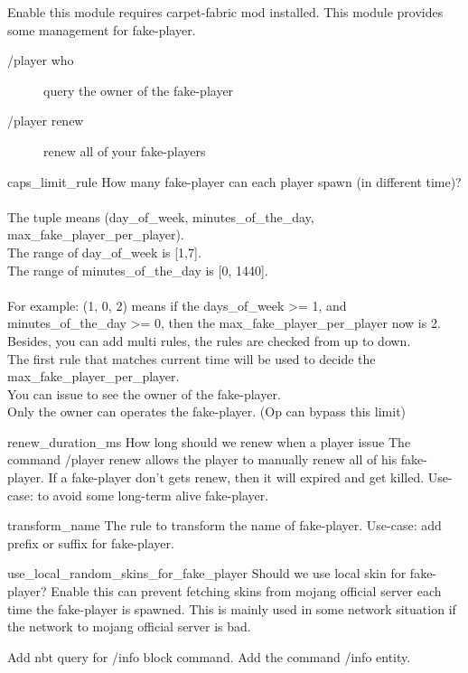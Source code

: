 


Enable this module requires carpet-fabric mod installed.
This module provides some management for fake-player.

\begin{description}
    \item [/player who] query the owner of the fake-player
    \item[/player renew] renew all of your fake-players
\end{description}

\begin{Configuration}
    \item[caps\_limit\_rule] {
        How many fake-player can each player spawn (in different time)?\\
        \\
        The tuple means (day\_of\_week, minutes\_of\_the\_day, max\_fake\_player\_per\_player).\\
        The range of day\_of\_week is [1,7].\\
        The range of minutes\_of\_the\_day is [0, 1440].\\
        \\
        For example: (1, 0, 2) means if the days\_of\_week >= 1, and minutes\_of\_the\_day >= 0, then the max\_fake\_player\_per\_player now is 2.\\
        Besides, you can add multi rules, the rules are checked from up to down.\\
        The first rule that matches current time will be used to decide the max\_fake\_player\_per\_player.\\
        You can issue  to see the owner of the fake-player.\\
        Only the owner can operates the fake-player. (Op can bypass this limit)
    }

    \item[renew\_duration\_ms] {
        How long should we renew when a player issue 
        The command /player renew allows the player to manually renew all of his fake-player.
        If a fake-player don't gets renew, then it will expired and get killed.
        Use-case: to avoid some long-term alive fake-player.
    }

    \item[transform\_name]{
        The rule to transform the name of fake-player.
        Use-case: add prefix or suffix for fake-player.
    }
    \item[use\_local\_random\_skins\_for\_fake\_player]{
        Should we use local skin for fake-player?
        Enable this can prevent fetching skins from mojang official server each time the fake-player is spawned.
        This is mainly used in some network situation if the network to mojang official server is bad.
    }
\end{Configuration}

\clearpage

Add nbt query for /info block command.
Add the command /info entity.



